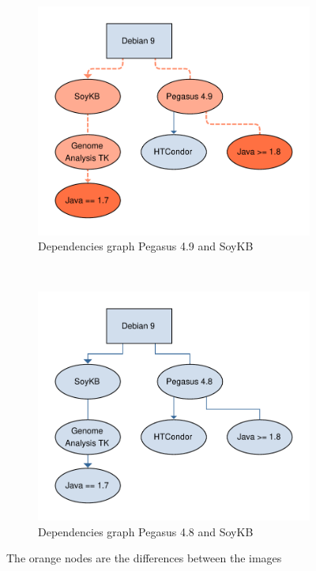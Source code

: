 \begin{figure}[]
    \centering
    \begin{subfigure}[b]{0.40\textwidth}
         \centering
         \includegraphics[width=\textwidth]{Figures/pegasus-49.pdf}
         \caption{Dependencies graph Pegasus 4.9 and SoyKB}
         \label{fig:pegasus49}
     \end{subfigure}
    ~ 
    \begin{subfigure}[b]{0.40\textwidth}
         \centering
         \includegraphics[width=\textwidth]{Figures/pegasus-48.pdf}
         \caption{Dependencies graph Pegasus 4.8 and SoyKB}
         \label{fig:pegasus48}
     \end{subfigure}
        \caption{The orange nodes are the differences between the images}
        \label{fig:dependencies-graph}
\end{figure}

